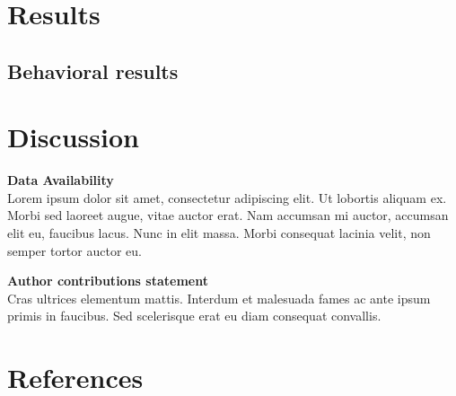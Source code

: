 \begin{refsection}
\vspace{-0.25cm}
\section{Results}
\vspace{-0.25cm}


\vspace{-0.25cm}
\subsection*{Behavioral results}
\vspace{-0.25cm}






\section{Discussion}
\vspace{-0.25cm}



\vspace*{\fill}
\begin{footnotesize}

\noindent\textbf{Data Availability}\\
\noindent Lorem ipsum dolor sit amet, consectetur adipiscing elit. Ut lobortis aliquam ex. Morbi sed laoreet augue, vitae auctor erat. Nam accumsan mi auctor, accumsan elit eu, faucibus lacus. Nunc in elit massa. Morbi consequat lacinia velit, non semper tortor auctor eu.

\noindent\textbf{Author contributions statement}\\
\noindent Cras ultrices elementum mattis. Interdum et malesuada fames ac ante ipsum primis in faucibus. Sed scelerisque erat eu diam consequat convallis. 

\end{footnotesize}

\newpage

\section{References}
\RemoveLabels

\printbibliography[heading=none]

\end{refsection}